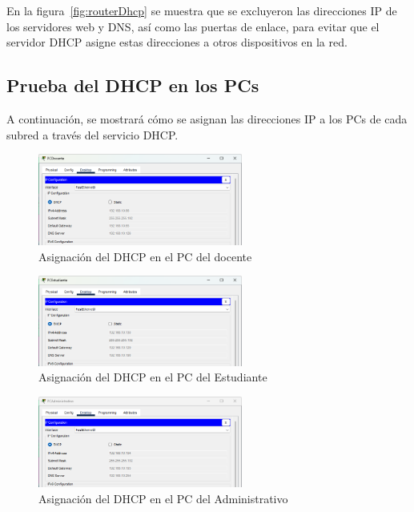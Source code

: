     En la figura~\ref{fig:routerDhcp} se muestra que se excluyeron las direcciones IP de los servidores web y DNS, así como las puertas de enlace, para evitar que el servidor DHCP asigne estas direcciones a otros dispositivos en la red.

    \subsection*{Prueba del DHCP en los PCs}
    A continuación, se mostrará cómo se asignan las direcciones IP a los PCs de cada subred a través del servicio DHCP.
    \begin{figure}[H]
        \centering
        \includegraphics[width=0.6\textwidth]{img/dhcpdoc.png}
        \caption{Asignación del DHCP en el PC del docente}
        \label{fig:pcdDhcp}
    \end{figure}
    \begin{figure}[H]
        \centering
        \includegraphics[width=0.6\textwidth]{img/dchpestu.png}
        \caption{Asignación del DHCP en el PC del Estudiante}
        \label{fig:pceDhcp}
    \end{figure}
    \begin{figure}[H]
        \centering
        \includegraphics[width=0.6\textwidth]{img/dhcpAdminis.png}
        \caption{Asignación del DHCP en el PC del Administrativo}
        \label{fig:pcADhcp}
    \end{figure}
   
